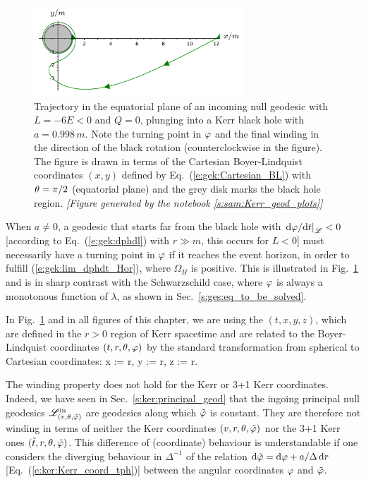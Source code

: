 \begin{figure}
\centerline{\includegraphics[width=0.7\textwidth]{gek_winding_null.pdf}}
\caption[]{\label{f:gek:winding_null} \footnotesize
Trajectory in the equatorial plane of an incoming null geodesic with
$L=-6E < 0$ and $Q=0$, plunging into a Kerr black hole with $a = 0.998 \, m$.
Note the turning point in $\varphi$ and the final winding in the direction of the black
rotation (counterclockwise in the figure). The figure is drawn in terms
of the Cartesian Boyer-Lindquist coordinates $(x,y)$ defined by
Eq.~(\ref{e:gek:Cartesian_BL}) with $\theta=\pi/2$ (equatorial plane)
and the grey disk marks the black hole region.
\textsl{[Figure generated by the notebook \ref{s:sam:Kerr_geod_plots}]}
}
\end{figure}


\begin{remark}
When $a\not=0$,
a geodesic that starts far from the black hole with
$\left. \mathrm{d}\varphi/\mathrm{d} t \right| _{\mathscr{L}} < 0$ [according to Eq.~(\ref{e:gek:dphdl}) with $r\gg m$,
this occurs for $L <0$]
must necessarily have a turning point in $\varphi$
if it reaches the event horizon, in order to fulfill (\ref{e:gek:lim_dphdt_Hor}),
where $\Omega_H$ is positive. This is illustrated in Fig.~\ref{f:gek:winding_null}
and is in sharp contrast with the Schwarzschild case, where $\varphi$ is always
a monotonous function of $\lambda$, as shown in Sec.~\ref{s:ges:eq_to_be_solved}.
\end{remark}

In Fig.~\ref{f:gek:winding_null} and in all figures of this chapter, we are
using the  $(t,x,y,z)$, which are
defined in the $r>0$ region of Kerr spacetime and are related to the
Boyer-Lindquist coordinates $(t,r,\theta,\varphi)$ by the standard transformation
from spherical to Cartesian coordinates:
\be \label{e:gek:Cartesian_BL}
    x := r\sin\th\cos\ph,\qquad
    y := r\sin\th\sin\ph,\qquad
    z := r\cos\th .
\ee

\begin{remark}
The winding property does not hold for the Kerr or 3+1 Kerr coordinates. Indeed,
we have seen in Sec.~\ref{s:ker:principal_geod} that the
ingoing principal null geodesics $\mathscr{L}^{\rm in}_{(v,\theta,{\tilde\varphi})}$ are geodesics
along which ${\tilde\varphi}$ is constant. They are therefore not winding in terms
of neither the Kerr coordinates $(v,r,\theta,{\tilde\varphi})$ nor the 3+1 Kerr ones $({\tilde t},r,\theta,{\tilde\varphi})$.
This difference of (coordinate) behaviour is understandable if one considers
the diverging behaviour in $\Delta^{-1}$ of the
relation $\mathrm{d} {\tilde\varphi} = \mathrm{d} \varphi + a/\Delta\, \mathrm{d} r$ [Eq.~(\ref{e:ker:Kerr_coord_tph})]
between the angular coordinates $\varphi$ and ${\tilde\varphi}$.
\end{remark}

